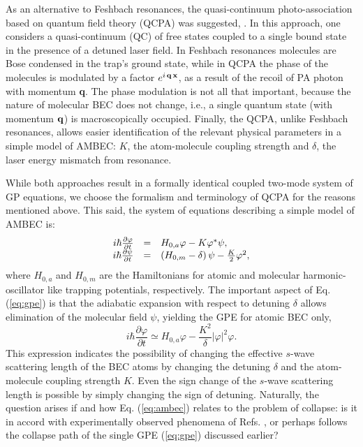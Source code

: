 \documentclass[%
   final       %
]{prospectus}
\begin{document}
As an alternative to Feshbach resonances, the quasi-continuum
photo-association based on quantum field theory 
(QCPA) was suggested, \cite{jjonpa1998}. In this approach,
one considers a quasi-continuum (QC) of free states coupled to a single bound
state in the presence of a detuned laser field. 
In Feshbach resonances 
molecules are Bose condensed in the trap's ground state, while in QCPA
the phase of the  molecules is modulated by a factor $e^{i \, {\bf q \, x}}$,
as a result of the recoil of PA photon with momentum {\bf q}. 
The phase modulation is not all that important, 
because the nature of molecular BEC does not change, i.e., a single
quantum state (with momentum ${\bf q}$) is
macroscopically occupied.
Finally, the QCPA, unlike Feshbach resonances, allows easier identification of
the relevant physical parameters in a simple model of AMBEC:
$K$, the atom-molecule coupling strength and
$\delta$, the laser energy mismatch from resonance.

While both approaches result in a formally identical coupled two-mode system
of GP equations, we choose the formalism and terminology of
QCPA for the reasons mentioned above. This said, the system of equations 
describing a simple model of AMBEC is:
\begin{equation}
  \label{eq:ambec}
  \begin{array}[t]{rcl}
  i \hbar \frac {\partial \varphi}{\partial t} &=&
  H_{0,a} \varphi - K \varphi^* \psi, \\
  i \hbar \frac {\partial \psi}{\partial t} &= &
  \left( H_{0,m}-\delta \right)  \psi - 
  \frac K 2 \varphi^2,
  \end{array}
\end{equation}
where $H_{0,a}$ and $H_{0,m}$ are the Hamiltonians for atomic and molecular
harmonic-oscillator like trapping potentials, respectively. The important
aspect of  Eq. (\ref{eq:gpe}) is that the adiabatic expansion
with respect to detuning $\delta$ allows elimination of the molecular field
$\psi$, yielding the GPE for atomic BEC only,
\begin{equation}
  \label{eq:adiabatic}
  i \hbar \frac {\partial \varphi}{\partial t} \simeq
  H_{0,a} \varphi - \frac {K^2} {\delta}  |\varphi|^2 \varphi.
\end{equation}
This expression indicates the possibility of changing the effective
$s$-wave scattering length of the BEC atoms by changing the
detuning $\delta$ and the atom-molecule coupling strength $K$. Even the sign
change of the $s$-wave scattering length is possible
by simply changing the sign of detuning. 
Naturally, the question arises if and how Eq. (\ref{eq:ambec}) relates to
the problem of collapse: is it in accord with experimentally 
observed phenomena of Refs.
\cite{Robertsetal2001,Robertsetal2001B,Cornishetal2000}, or perhaps follows
the collapse path of the single GPE (\ref{eq:gpe}) discussed earlier?
\end{document}

